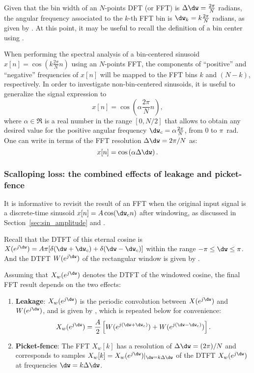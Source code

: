 Given that the bin width of an $N$-points DFT (or FFT) is $\Delta \dw = \frac{2 \pi }{N}$ radians, the angular frequency associated to the $k$-th FFT bin is $\dw_k = k \frac{2 \pi }{N}$ radians, as given by .
At this point, it may be useful to recall the definition of a bin center using .

When performing the spectral analysis of a bin-centered sinusoid $x[n]=\cos(k \frac{2 \pi }{N}n)$ using an $N$-points FFT, the components of ``positive'' and ``negative'' frequencies of $x[n]$ will be mapped to the FFT bins $k$ and $(N-k)$, respectively. In order to investigate non-bin-centered sinusoids, it is useful to generalize the signal expression to 
\begin{equation}
x[n]=\cos \left( \alpha \frac{2 \pi }{N}n \right),
\label{eq:cosine_alternative}
\end{equation}
where $\alpha \in \Re$ is a real number in the range $[0, N/2]$ that allows to obtain any desired value for the positive angular frequency $\dw_c = \alpha \frac{2 \pi}{N}$, from 0 to $\pi$~rad.
One can write  in terms of the FFT resolution $\Delta \dw = 2 \pi / N$ as:
\begin{equation}
x[n]=\cos \left( \alpha \Delta \dw \right).
\end{equation}

\subsubsection{Scalloping loss: the combined effects of leakage and picket-fence}
\label{sec:ExampleLeakagePicketFence}

It is informative to revisit the result of an FFT when the original input signal is a discrete-time sinusoid $x[n]=A \cos(\dw_c n)$ after windowing, as discussed in Section~\ref{sec:sin_amplitude} and . 

Recall that the DTFT of this eternal cosine is $X(e^{j \dw}) = A \pi [\delta(\dw + \dw_c) + \delta(\dw - \dw_c)]$ within the range $-\pi \le \dw \le \pi$. And the DTFT $W(e^{j \dw})$ of the rectangular window is given by .

Assuming that $X_w(e^{j \dw})$ denotes the DTFT of the windowed cosine, the final FFT result depends on the two effects:
\begin{enumerate}
	\item \textbf{Leakage}: $X_w(e^{j \dw})$ is the periodic convolution between $X(e^{j \dw})$ and $W(e^{j \dw})$, and is
	given by , which is repeated below for convenience:
	\[
	X_w(e^{j \dw}) = \frac{A}{2} \left[W(e^{j (\dw + \dw_c)}) + W(e^{j (\dw - \dw_c)})\right].
	\]
	\item \textbf{Picket-fence}: The FFT $X_w[k]$ has a resolution of $\Delta \dw = (2 \pi)/N$ and corresponds to samples $X_w[k] = X_w(e^{j \dw})|_{\dw = k \Delta \dw}$ of the DTFT $X_w(e^{j \dw})$ at frequencies $\dw = k \Delta \dw$.
\end{enumerate}


